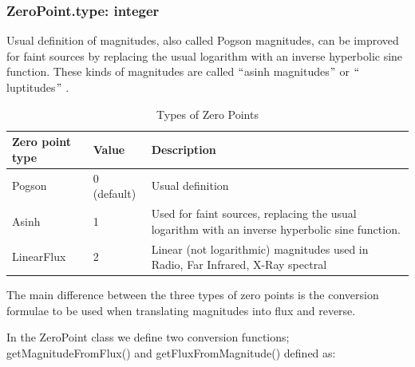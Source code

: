 \documentclass[11pt,a4paper]{ivoa}
\begin{document}
\subsubsection{ZeroPoint.type: integer}
Usual definition of magnitudes, also called Pogson magnitudes, can be improved 
for faint sources by replacing the usual logarithm with an inverse hyperbolic 
sine function. These kinds of magnitudes are called $``$asinh magnitudes$"$  
or $``$luptitudes$"$  \citep{2004A&A...422..205G}.\par



\begin{table}[ht]
 			\centering
\begin{tabular}{p{2.42in}p{0.8in}p{1.55in}}
\hline
\multicolumn{1}{|p{2.42in}}{Zero point type} &
\multicolumn{1}{|p{0.8in}}{Value} &
\multicolumn{1}{|p{1.55in}|}{Description} \\
\hline
\multicolumn{1}{|p{2.42in}}{Pogson} &
\multicolumn{1}{|p{0.8in}}{0 (default)} &
\multicolumn{1}{|p{1.55in}|}{Usual definition} \\
\hline
\multicolumn{1}{|p{2.42in}}{Asinh} &
\multicolumn{1}{|p{0.8in}}{1} &
\multicolumn{1}{|p{1.55in}|}{Used for faint sources, replacing the usual 
logarithm with an inverse hyperbolic sine function.} \\
\hline
\multicolumn{1}{|p{2.42in}}{LinearFlux} &
\multicolumn{1}{|p{0.8in}}{2} &
\multicolumn{1}{|p{1.55in}|}{Linear (not logarithmic) magnitudes used in 
Radio, Far Infrared, X-Ray spectral } \\
\hline
\end{tabular}
\caption{Types of Zero Points}
 \end{table}



The main difference between the three types of zero points is the 
conversion formulae to be used when translating magnitudes into flux and 
reverse.\par

In the ZeroPoint class we define two conversion functions; 
getMagnitudeFromFlux() and getFluxFromMagnitude() defined as:\par
\end{document}
